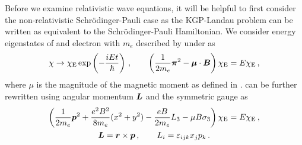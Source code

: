 Before we examine relativistic wave equations, it will be helpful to first consider the non-relativistic Schr{\"o}dinger-Pauli case as the KGP-Landau problem can be written as equivalent to the Schr{\"o}dinger-Pauli Hamiltonian. We consider energy eigenstates of and electron with $m_{e}$ described by  under  as
\begin{alignat}{1}
	\label{homogeneous:3} \chi\rightarrow\chi_\mathrm{E}\exp\left(-\frac{iEt}{\hbar}\right)\,,\qquad\left(\frac{1}{2m_{e}}\boldsymbol{\pi}^{2}-\boldsymbol{\mu}\cdot\boldsymbol{B}\right)\chi_\mathrm{E}=E\chi_\mathrm{E}\,,
\end{alignat}
where $\mu$ is the magnitude of the magnetic moment as defined in .  can be further rewritten using angular momentum $\boldsymbol{L}$ and the symmetric gauge  as
\begin{gather}
	\label{homogeneous:4} \left(\frac{1}{2m_{e}}\boldsymbol{p}^{2}+\frac{e^{2}B^{2}}{8m_{e}}(x^{2}+y^{2})-\frac{eB}{2m_{e}}L_{3}-\mu B\sigma_{3}\right)\chi_\mathrm{E}=E\chi_\mathrm{E}\,,\\
    \boldsymbol{L}=\boldsymbol{r}\times\boldsymbol{p}\,,\qquad L_{i}=\varepsilon_{ijk}x_{j}p_{k}\,.
\end{gather}

